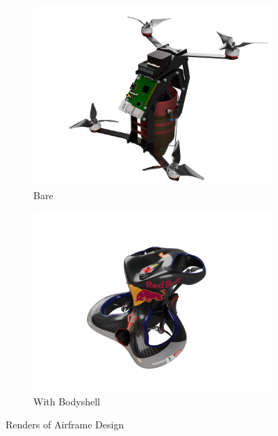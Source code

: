 \documentclass[11pt]{article}
\begin{document}
\begin{figure}[h]
    \begin{subfigure}{0.48\textwidth}
        \includegraphics[width=\linewidth]{saucy_render_bare}
        \caption{Bare}
        \label{fig:saucy_render_bare}
    \end{subfigure}\hspace*{\fill}
    \begin{subfigure}{0.48\textwidth}
        \includegraphics[width=\linewidth]{saucy_render_w_bodyshell}
        \caption{With Bodyshell}
        \label{fig:saucy_render_w_bodyshell}
    \end{subfigure}

    \caption{Renders of Airframe Design}
    \label{fig:saucy_render}
\end{figure}
\end{document}
